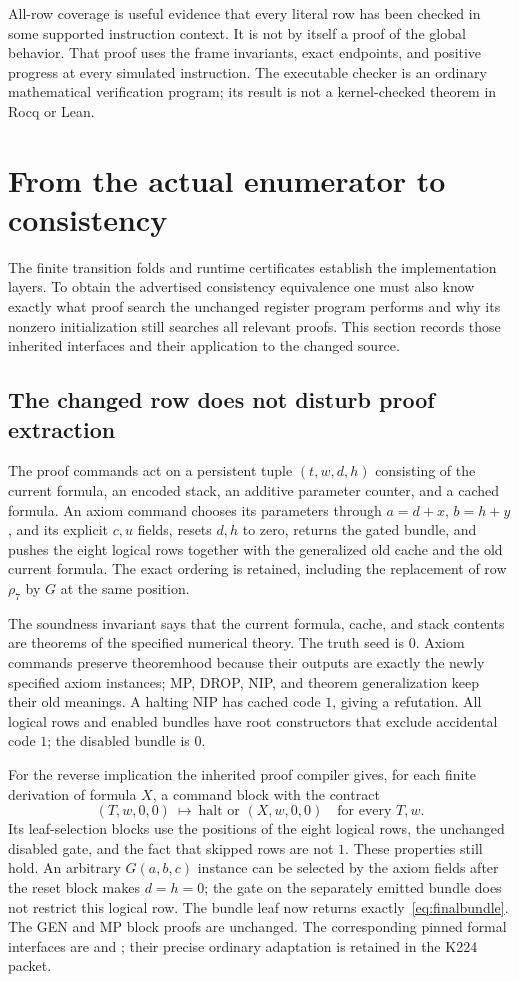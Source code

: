 All-row coverage is useful evidence that every literal row has been
checked in some supported instruction context. It is not by itself a
proof of the global behavior. That proof uses the frame invariants,
exact endpoints, and positive progress at every simulated instruction.
The executable checker is an ordinary mathematical verification program;
its result is not a kernel-checked theorem in Rocq or Lean.

\section{From the actual enumerator to consistency}
\label{sec:chain}

The finite transition folds and runtime certificates establish the
implementation layers. To obtain the advertised consistency equivalence
one must also know exactly what proof search the unchanged register
program performs and why its nonzero initialization still searches all
relevant proofs. This section records those inherited interfaces and
their application to the changed source.

\subsection{The changed row does not disturb proof extraction}

The proof commands act on a persistent tuple $(t,w,d,h)$ consisting of
the current formula, an encoded stack, an additive parameter counter,
and a cached formula. An axiom command chooses its parameters through
$a=d+x$, $b=h+y$, and its explicit $c,u$ fields, resets $d,h$ to zero,
returns the gated bundle, and pushes the eight logical rows together
with the generalized old cache and the old current formula. The exact
ordering is retained, including the replacement of row $\rho_7$ by $G$
at the same position.

The soundness invariant says that the current formula, cache, and
stack contents are theorems of the specified numerical theory. The
truth seed is $0$. Axiom commands preserve theoremhood because their
outputs are exactly the newly specified axiom instances; MP, DROP,
NIP, and theorem generalization keep their old meanings. A halting
NIP has cached code $1$, giving a refutation. All logical rows and
enabled bundles have root constructors that exclude accidental code
$1$; the disabled bundle is $0$.

For the reverse implication the inherited proof compiler gives, for
each finite derivation of formula $X$, a command block with the contract
\[
 (T,w,0,0)\ \longmapsto\ \text{halt or }(X,w,0,0)
 \quad\text{for every }T,w.
\]
Its leaf-selection blocks use the positions of the eight logical rows,
the unchanged disabled gate, and the fact that skipped rows are not
$1$. These properties still hold. An arbitrary $G(a,b,c)$ instance
can be selected by the axiom fields after the reset block makes $d=h=0$;
the gate on the separately emitted bundle does not restrict this logical
row. The bundle leaf now returns exactly~\eqref{eq:finalbundle}.
The GEN and MP block proofs are unchanged. The corresponding pinned
formal interfaces are  and ; their
precise ordinary adaptation is retained in the K224 packet.

